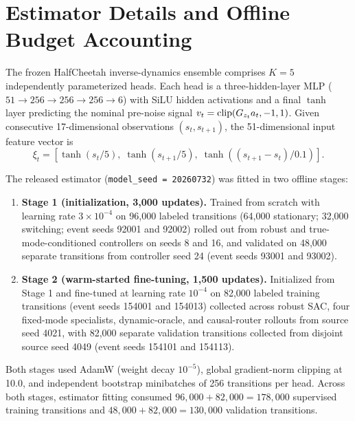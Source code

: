 \section{Estimator Details and Offline Budget Accounting}
\label{app:estimator}

The frozen HalfCheetah inverse-dynamics ensemble comprises $K=5$ independently parameterized heads. Each head is a three-hidden-layer MLP ($51\to 256\to 256\to 256\to 6$) with SiLU hidden activations and a final $\tanh$ layer predicting the nominal pre-noise signal $v_t=\operatorname{clip}(G_{z_t}a_t,-1,1)$. Given consecutive 17-dimensional observations $(s_t,s_{t+1})$, the 51-dimensional input feature vector is
\begin{equation}
    \xi_t=\left[
      \tanh(s_t/5),\;
      \tanh(s_{t+1}/5),\;
      \tanh((s_{t+1}-s_t)/0.1)
    \right].
\end{equation}

The released estimator (\texttt{model\_seed = 20260732}) was fitted in two offline stages:
\begin{enumerate}[leftmargin=*]
    \item \textbf{Stage 1 (initialization, 3,000 updates).} Trained from scratch with learning rate $3\times 10^{-4}$ on 96,000 labeled transitions (64,000 stationary; 32,000 switching; event seeds 92001 and 92002) rolled out from robust and true-mode-conditioned controllers on seeds 8 and 16, and validated on 48,000 separate transitions from controller seed 24 (event seeds 93001 and 93002).
    \item \textbf{Stage 2 (warm-started fine-tuning, 1,500 updates).} Initialized from Stage 1 and fine-tuned at learning rate $10^{-4}$ on 82,000 labeled training transitions (event seeds 154001 and 154013) collected across robust SAC, four fixed-mode specialists, dynamic-oracle, and causal-router rollouts from source seed 4021, with 82,000 separate validation transitions collected from disjoint source seed 4049 (event seeds 154101 and 154113).
\end{enumerate}
Both stages used AdamW (weight decay $10^{-5}$), global gradient-norm clipping at 10.0, and independent bootstrap minibatches of 256 transitions per head. Across both stages, estimator fitting consumed $96{,}000+82{,}000=178{,}000$ supervised training transitions and $48{,}000+82{,}000=130{,}000$ validation transitions.

